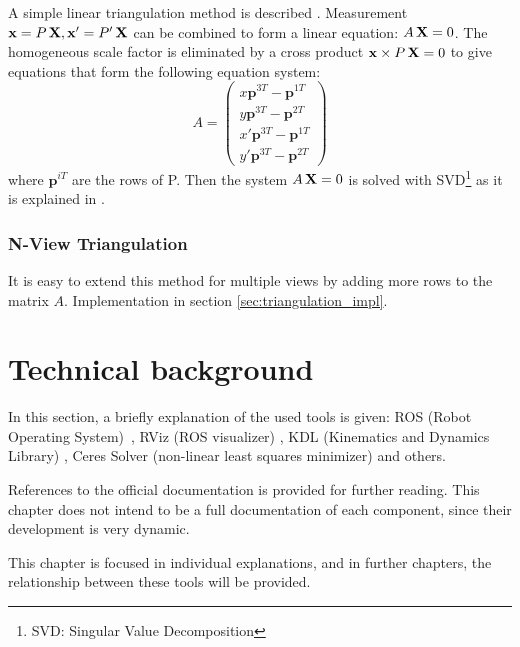 A simple linear triangulation method is described \cite{HZ2}. Measurement $\mathbf{x} = P \, \mathbf{X} , \mathbf{x'} = P' \, \mathbf{X}$ can be combined to form a linear equation: $A\, \mathbf{X} = 0$. The homogeneous scale factor is eliminated by a cross product $\mathbf{x} \times P\,\mathbf{X} = 0$ to give equations that form the following equation system:
\begin{equation}
A =
\begin{pmatrix}
  x \mathbf{p}^{3T} - \mathbf{p}^{1T} \\
  y \mathbf{p}^{3T} - \mathbf{p}^{2T} \\
  x' \mathbf{p}^{3T} - \mathbf{p}^{1T} \\
  y' \mathbf{p}^{3T} - \mathbf{p}^{2T}
\end{pmatrix}
\end{equation}
where $\mathbf{p}^{iT}$ are the rows of P. Then the system $A\, \mathbf{X} = 0$ is solved with SVD\footnote{SVD: Singular Value Decomposition} as it is explained in \cite{HZ2}.




\subsubsection{N-View Triangulation}
\label{sec:nview_triangulation}

It is easy to extend this method for multiple views by adding more rows to the matrix $A$. Implementation in section \ref{sec:triangulation_impl}.





\section{Technical background}
\label{cha:technical_background}

In this section, a briefly explanation of the used tools is given: ROS (Robot Operating System)~\cite{ROS}, RViz (ROS visualizer) \cite{RViz}, KDL (Kinematics and Dynamics Library) \cite{KDL}, Ceres Solver (non-linear least squares minimizer) \cite{ceres} and others.

References to the official documentation is provided for further reading. This chapter does not intend to be a full documentation of each component, since their development is very dynamic.

This chapter is focused in individual explanations, and in further chapters, the relationship between these tools will be provided.

